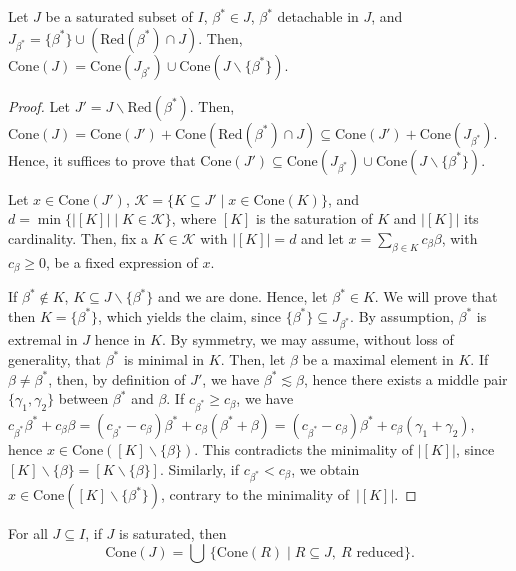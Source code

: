 \documentclass[ALCO,published]{cedram}
\theoremstyle{plain}
\newcommand\mc{\mathcal}
\newcommand\smeno{\smallsetminus}
\newcommand\cone{\mathrm{Cone}}
\newcommand\be{\beta}
\newcommand\ga{\gamma}
\newcommand\red{\mathrm{Red}}
\begin{document}
\begin{lem}\label{lem:coni-detachable}
Let $J$ be a saturated subset of $I$, $\be^*\in J$,  $\be^*$ detachable in  $J$, and $J_{\be^*}=\{\be^*\}\cup (\red(\be^*)\cap J)$. Then, $\cone(J)=\cone(J_{\be^*})\cup \cone(J\smeno\{\be^*\})$.
\end{lem}

\begin{proof}
Let $J'=J\smeno \red(\be^*)$. 
Then, $\cone(J)=\cone(J')+ \cone(\red(\be^*)\cap J)\subseteq
\cone(J')+ \cone(J_{\be^*}).$ 
Hence, it suffices to prove that $\cone(J')\subseteq \cone(J_{\be^*})\cup \cone(J\smeno\{\be^*\})$. 

\par
Let $x\in\cone(J')$,  $\mc K=\{K\subseteq J'\mid x\in \cone(K)\}$, and $d=\min\{|[K]|\mid K\in \mc K\}$, where $[K]$ is the saturation of $K$ and $|[K]|$ its cardinality. 
Then,  fix a $K\in \mc K$ with $|[K]|=d$ and let  $x=\sum\limits_{\be\in K}c_\be\be$, with $c_\be\geq 0$,  be a fixed expression of $x$.
\par 
If $\be^*\not\in K$, $K\subseteq J\smeno\{\be^*\}$ and we are done. 
Hence, let $\be^*\in K$. 
We will prove that then $K=\{\be^*\}$, which yields the claim, since $\{\be^*\}\subseteq J_{\be^*}$.
By assumption, $\be^*$ is extremal in $J$ hence in $K$. 
By symmetry, we may assume, without loss of generality, that $\be^*$ is minimal in $K$. 
Then, let $\be$ be a maximal element in $K$. 
If $\be\neq \be^*$, then, by definition of $J'$, we have $\be^*\lesssim \be$, hence there exists a middle pair $\{\ga_1, \ga_2\}$ between $\be^*$ and $\be$.
If $c_{\be^*}\geq c_\be$, we have $c_{\be^*}\be^*+c_\be\be=(c_{\be^*}-c_\be)\be^*+c_\be(\be^*+\be)=
(c_{\be^*}-c_\be)\be^*+c_\be(\ga_1+\ga_2)$, hence $x\in \cone([K]\smeno \{\be\})$. 
This contradicts the minimality of $|[K]|$, since
$[K]\smeno\{\be\}=[K\smeno\{\be\}]$.
Similarly, if $c_{\be^*}< c_\be$, we obtain $x\in \cone([K]\smeno \{\be^*\})$, contrary to the minimality of~$|[K]|$. 
\end{proof}

\begin{pro}\label{pro:cover}
For all $J\subseteq I$, if $J$ is saturated, then
$$
\cone(J)=\bigcup\,\{\cone(R)\mid R\subseteq J, \  R \text{ reduced}\}.
$$
\end{pro}
\end{document}
